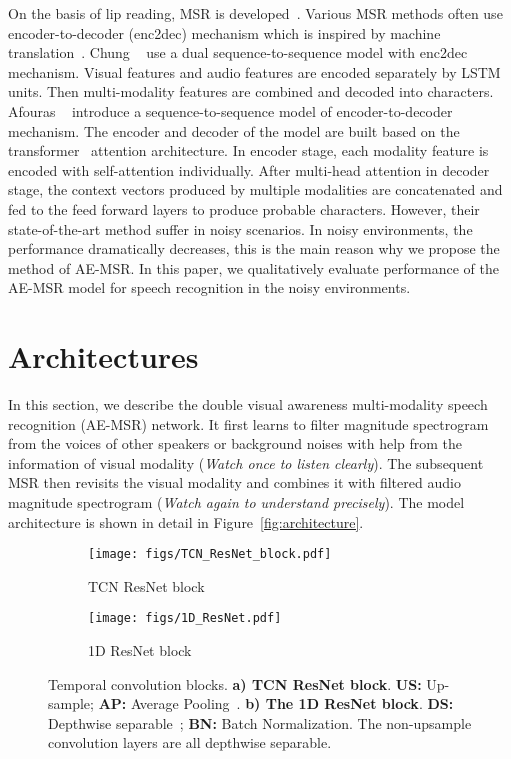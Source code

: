 \documentclass[10pt,twocolumn,letterpaper]{article}
\begin{document}
On the basis of lip reading, MSR is developed~\cite{chung2017lip,Triantafyllos-avsr2018}. Various MSR methods often use encoder-to-decoder (enc2dec) mechanism which is inspired by machine translation~\cite{bahdanau2014neural,chan2016listen,graves2006connectionist,graves2014towards,sutskever2014sequence,vaswani2017attention}. Chung \etal~\cite{chung2017lip} use a dual sequence-to-sequence model with enc2dec mechanism. Visual features and audio features are encoded separately by LSTM units. Then multi-modality features are combined and decoded into characters. Afouras \etal~\cite{Triantafyllos-avsr2018} introduce a sequence-to-sequence model of encoder-to-decoder mechanism. The encoder and decoder of the model are built based on the transformer~\cite{vaswani2017attention} attention architecture. In encoder stage, each modality feature is encoded with self-attention individually. After multi-head attention in decoder stage, the context vectors produced by multiple modalities are concatenated and fed to the feed forward layers to produce probable characters. However, their state-of-the-art method suffer in noisy scenarios. In noisy environments, the performance dramatically decreases, this is the main reason why we propose the method of AE-MSR. In this paper, we qualitatively evaluate performance of the AE-MSR model for speech recognition in the noisy environments.  
\section{Architectures}
In this section, we describe the double visual awareness multi-modality speech recognition (AE-MSR) network. It first learns to filter magnitude spectrogram from the voices of other speakers or background noises with help from the information of visual modality (\emph{Watch once to listen clearly}). The subsequent MSR then revisits the visual modality and combines it with filtered audio magnitude spectrogram  (\emph{Watch again to understand precisely}). The model architecture is shown in detail in Figure~\ref{fig:architecture}.
\begin{figure}[t]
\begin{subfigure}[t]{1.4in}
\centering
        \texttt{[image: figs/TCN\_ResNet\_block.pdf]}
\caption{TCN ResNet block}
        \label{fig:TCN_ResNet_block}
    \end{subfigure}
    \qquad\qquad
    \begin{subfigure}[t]{1.4in}
        \centering
        \texttt{[image: figs/1D\_ResNet.pdf]}
        \caption{1D ResNet block}
        \label{fig:1D_ResNet_block}
    \end{subfigure}
\caption{Temporal convolution blocks.  {\bf a) TCN ResNet block}. {\bf US:} Up-sample; {\bf AP:} Average Pooling~\cite{he2016deep}. {\bf b) The 1D ResNet block}. {\bf DS:} Depthwise separable~\cite{chollet2017xception}; {\bf BN:} Batch Normalization. The non-upsample convolution layers are all depthwise separable.}
\label{fig:temporal_conv}
\end{figure}\\
\end{document}
